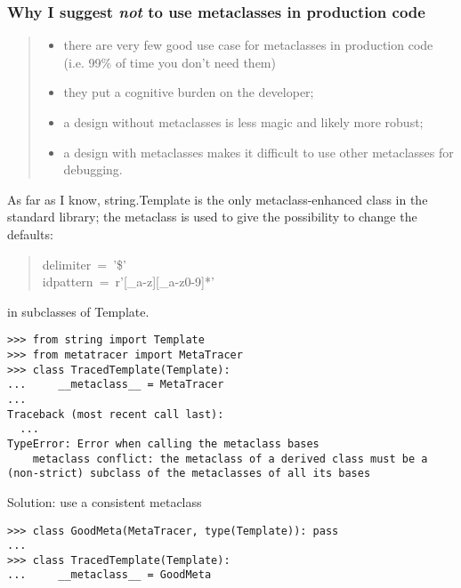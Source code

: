 \documentclass[10pt,a4paper,english]{article}
\begin{document}
\subsubsection*{Why I suggest \emph{not} to use metaclasses in production code}
\begin{quote}
\begin{itemize}
\item {} 
there are very few good use case for metaclasses in production code
(i.e. 99{\%} of time you don't need them)

\item {} 
they put a cognitive burden on the developer;

\item {} 
a design without metaclasses is less magic and likely more robust;

\item {} 
a design with metaclasses makes it difficult to use other metaclasses 
for debugging.

\end{itemize}
\end{quote}

As far as I know, string.Template is the only metaclass-enhanced class
in the standard library; the metaclass is used to give the possibility to
change the defaults:
\begin{quote}{\ttfamily \raggedright \noindent
delimiter~=~'{\$}'~\\
idpattern~=~r'{[}{\_}a-z]{[}{\_}a-z0-9]*'
}\end{quote}

in subclasses of Template.
\begin{verbatim}>>> from string import Template
>>> from metatracer import MetaTracer
>>> class TracedTemplate(Template):
...     __metaclass__ = MetaTracer
...
Traceback (most recent call last):
  ...
TypeError: Error when calling the metaclass bases
    metaclass conflict: the metaclass of a derived class must be a (non-strict) subclass of the metaclasses of all its bases\end{verbatim}

Solution: use a consistent metaclass
\begin{verbatim}>>> class GoodMeta(MetaTracer, type(Template)): pass
...
>>> class TracedTemplate(Template):
...     __metaclass__ = GoodMeta\end{verbatim}



\hypertarget{is-there-an-automatic-way-of-solving-the-conflict}{}
\end{document}
